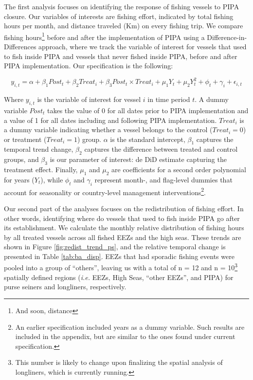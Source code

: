 \documentclass[12pt,]{article}
\let\rmarkdownfootnote\footnote%
\def\footnote{\protect\rmarkdownfootnote}
\begin{document}
The first analysis focuses on identifying the response of fishing
vessels to PIPA closure. Our variables of interests are fishing effort,
indicated by total fishing hours per month, and distance traveled (Km)
on every fishing trip. We compare fishing hours\footnote{And soon,
  distance} before and after the implementation of PIPA using a
Difference-in-Differences approach, where we track the variable of
interest for vessels that used to fish inside PIPA and vessels that
never fished inside PIPA, before and after PIPA implementation. Our
specification is the following:

\[
y_{i,t} = \alpha + \beta_1 Post_t + \beta_2 Treat_i + \beta_3 Post_t \times Treat_i + \mu_1Y_t + \mu_2Y_t^2 + \phi_t + \gamma_i + \epsilon_{i,t}
\]

Where \(y_{i,t}\) is the variable of interest for vessel \(i\) in time
period \(t\). A dummy variable \(Post_t\) takes the value of 0 for all
dates prior to PIPA implementation and a value of 1 for all dates
including and following PIPA implementation. \(Treat_i\) is a dummy
variable indicating whether a vessel belongs to the control
(\(Treat_i = 0\)) or treatment (\(Treat_i = 1\)) group. \(\alpha\) is
the standard intercept, \(\beta_1\) captures the temporal trend change,
\(\beta_2\) captures the difference between treated and control groups,
and \(\beta_3\) is our parameter of interest: de DiD estimate capturing
the treatment effect. Finally, \(\mu_1\) and \(\mu_2\) are coefficients
for a second order polynomial for years (\(Y_t\)), while \(\phi_t\) and
\(\gamma_i\) represent month-, and flag-level dummies that account for
seasonality or country-level management interventions\footnote{An
  earlier specification included years as a dummy variable. Such results
  are included in the appendix, but are similar to the ones found under
  current specification.}.

Our second part of the analyses focuses on the redistribution of fishing
effort. In other words, identifying where do vessels that used to fish
inside PIPA go after its establishment. We calculate the monthly
relative distribution of fishing hours by all treated vessels across all
fished EEZs and the high seas. These trends are shown in Figure
\ref{fig:redist_trend_ps}, and the relative temporal change is presented
in Table \ref{tab:ba_disp}. EEZs that had sporadic fishing events were
pooled into a group of ``others'', leaving us with a total of n = 12 and
n = 10\footnote{This number is likely to change upon finalizing the
  spatial analysis of longliners, which is currently running.} spatially
defined regions (\emph{i.e.} EEZs, High Seas, ``other EEZs'', and PIPA)
for purse seiners and longliners, respectively.
\end{document}

